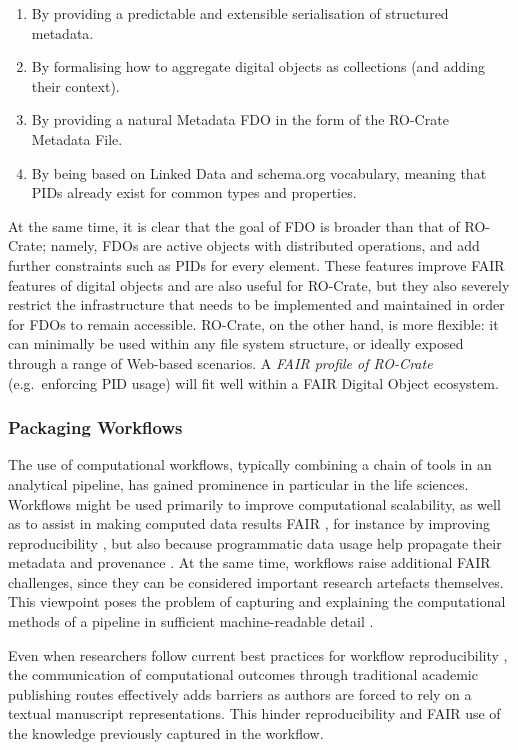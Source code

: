 \begin{enumerate}
\item
  By providing a predictable and extensible serialisation of structured
  metadata.
\item
  By formalising how to aggregate digital objects as collections (and
  adding their context).
\item
  By providing a natural Metadata FDO in the form of the RO-Crate
  Metadata File.
\item
  By being based on Linked Data and schema.org vocabulary, meaning that
  PIDs already exist for common types and properties.
\end{enumerate}

At the same time, it is clear that the goal of FDO is broader than that
of RO-Crate; namely, FDOs are active objects with distributed
operations, and add further constraints such as PIDs for every element.
These features improve FAIR features of digital objects and are also
useful for RO-Crate, but they also severely restrict the infrastructure
that needs to be implemented and maintained in order for FDOs to remain
accessible. RO-Crate, on the other hand, is more flexible: it can
minimally be used within any file system structure, or ideally exposed
through a range of Web-based scenarios. A \emph{FAIR profile of
RO-Crate} (e.g.~enforcing PID usage) will fit well within a FAIR Digital
Object ecosystem.

\subsubsection{Packaging Workflows}\label{ch5:packaging-workflows}

The use of computational workflows, typically combining a chain of tools
in an analytical pipeline, has gained prominence in particular in the
life sciences. Workflows might be used primarily to improve
computational scalability, as well as to assist in making computed data
results FAIR \cite{Goble 2020}, for
instance by improving reproducibility
\cite{Cohen-Boulakia 2017}, but also
because programmatic data usage help propagate their metadata and
provenance \cite{Kim 2008}. At the
same time, workflows raise additional FAIR challenges, since they can be
considered important research artefacts themselves. This viewpoint poses
the problem of capturing and explaining the computational methods of a
pipeline in sufficient machine-readable detail
\cite{Lamprecht 2019}.

Even when researchers follow current best practices for workflow
reproducibility
\cite{Grüning 2018b,Cohen-Boulakia 2017}, the
communication of computational outcomes through traditional academic
publishing routes effectively adds barriers as authors are forced to
rely on a textual manuscript representations. This hinder
reproducibility and FAIR use of the knowledge previously captured in the
workflow.

